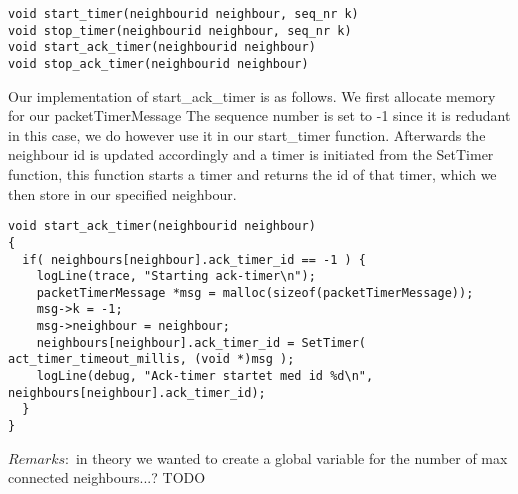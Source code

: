 \begin{lstlisting}
void start_timer(neighbourid neighbour, seq_nr k)
void stop_timer(neighbourid neighbour, seq_nr k)
void start_ack_timer(neighbourid neighbour)
void stop_ack_timer(neighbourid neighbour)
\end{lstlisting}

Our implementation of start\_ack\_timer is as follows. We first allocate memory for our {packetTimerMessage}
The sequence number is set to -1 since it is redudant in this case, we do however use it in our start\_timer function.
Afterwards the neighbour id is updated accordingly and a timer is initiated from the SetTimer function, this function starts a timer and returns the id of that timer,
which we then store in our specified neighbour.
\begin{lstlisting}
void start_ack_timer(neighbourid neighbour)
{
  if( neighbours[neighbour].ack_timer_id == -1 ) {
    logLine(trace, "Starting ack-timer\n");
    packetTimerMessage *msg = malloc(sizeof(packetTimerMessage));
    msg->k = -1;
    msg->neighbour = neighbour;
    neighbours[neighbour].ack_timer_id = SetTimer( act_timer_timeout_millis, (void *)msg );
    logLine(debug, "Ack-timer startet med id %d\n", neighbours[neighbour].ack_timer_id);
  }
}
\end{lstlisting}











$Remarks:$ in theory we wanted to create a global variable for the number of max connected neighbours...? TODO
